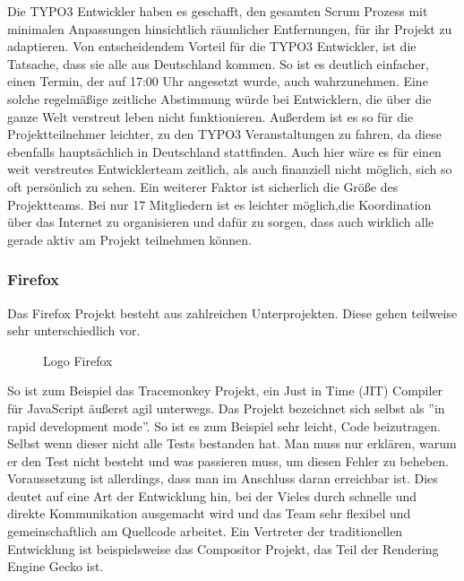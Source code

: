 Die TYPO3 Entwickler haben es geschafft, den gesamten Scrum Prozess mit minimalen Anpassungen hinsichtlich räumlicher Entfernungen, für ihr Projekt zu adaptieren. Von entscheidendem Vorteil für die TYPO3 Entwickler, ist die Tatsache, dass sie alle aus Deutschland kommen. So ist es deutlich einfacher, einen Termin, der auf 17:00 Uhr angesetzt wurde, auch wahrzunehmen. Eine solche regelmäßige zeitliche Abstimmung würde bei Entwicklern, die über die ganze Welt verstreut leben nicht funktionieren. Außerdem ist es so für die Projektteilnehmer leichter, zu den TYPO3 Veranstaltungen zu fahren, da diese ebenfalls hauptsächlich in Deutschland stattfinden. Auch hier wäre es für einen weit verstreutes Entwicklerteam zeitlich, als auch  finanziell nicht möglich, sich so oft persönlich zu sehen. Ein weiterer Faktor ist sicherlich die Größe des Projektteams. Bei nur 17 Mitgliedern ist es leichter möglich,die Koordination über das Internet zu  organisieren und dafür zu sorgen, dass auch wirklich alle gerade aktiv am Projekt teilnehmen können.

\subsubsection{Firefox}
Das Firefox Projekt besteht aus zahlreichen Unterprojekten. Diese gehen teilweise sehr unterschiedlich vor.
\begin{figure}[h]
	\centering
	\caption{Logo Firefox \cite{bib:logo-firefox}}
	\label{fireLogo}
\end{figure}
So ist zum Beispiel das Tracemonkey Projekt, ein Just in Time (JIT) Compiler für JavaScript äußerst agil unterwegs. Das Projekt bezeichnet sich selbst als ''in rapid development mode''. \cite{bib:trm} So ist es zum Beispiel sehr leicht, Code beizutragen. Selbst wenn dieser nicht alle Tests bestanden hat. Man muss nur erklären, warum er den Test nicht besteht und was passieren muss, um diesen Fehler zu beheben. \cite{bib:trm} Voraussetzung ist allerdings, dass man im Anschluss daran erreichbar ist. Dies deutet auf eine Art der Entwicklung hin,  bei der Vieles durch schnelle und direkte Kommunikation ausgemacht wird und das Team sehr flexibel und gemeinschaftlich am Quellcode arbeitet.  Ein Vertreter der traditionellen Entwicklung ist beispielsweise das  Compositor Projekt, das  Teil der Rendering Engine Gecko ist. \cite{bib:beltzner}


